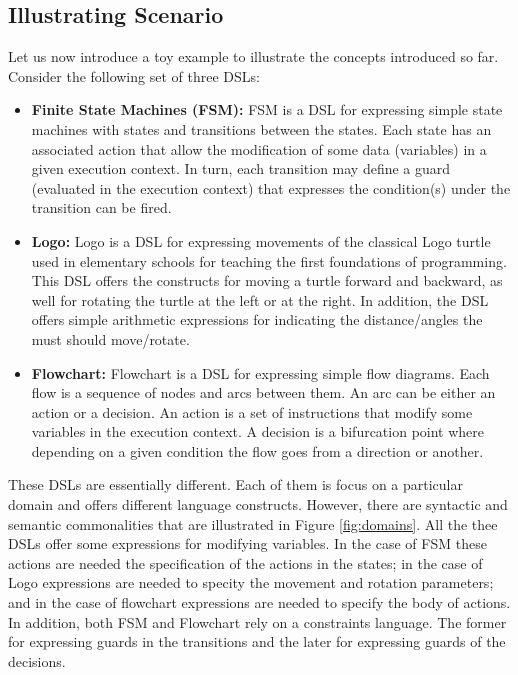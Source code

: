 \subsection{Illustrating Scenario}

Let us now introduce a toy example to illustrate the concepts introduced so far. Consider the following set of three DSLs:

\begin{itemize}
\item \textbf{Finite State Machines (FSM):} FSM is a DSL for expressing simple state machines with states and transitions between the states. Each state has an associated action that allow the modification of some data (variables) in a given execution context. In turn, each transition may define a guard (evaluated in the execution context) that expresses the condition(s) under the transition can be fired.

\vspace{2mm}
\item \textbf{Logo:} Logo is a DSL for expressing movements of the classical Logo turtle used in elementary schools for teaching the first foundations of programming. This DSL offers the constructs for moving a turtle forward and backward, as well for rotating the turtle at the left or at the right. In addition, the DSL offers simple arithmetic expressions for indicating the distance/angles the must should move/rotate. 

\vspace{2mm}
\item \textbf{Flowchart:} Flowchart is a DSL for expressing simple flow diagrams. Each flow is a sequence of nodes and arcs between them. An arc can be either an action or a decision. An action is a set of instructions that modify some variables in the execution context. A decision is a bifurcation point where depending on a given condition the flow goes from a direction or another. 
\end{itemize}

These DSLs are essentially different. Each of them is focus on a particular domain and offers different language constructs. However, there are syntactic and semantic commonalities that are illustrated in Figure \ref{fig:domains}. All the thee DSLs offer some expressions for modifying variables. In the case of FSM these actions are needed the specification of the actions in the states; in the case of Logo expressions are needed to specity the movement and rotation parameters; and in the case of flowchart expressions are needed to specify the body of actions. In addition, both FSM and Flowchart rely on a constraints language. The former for expressing guards in the transitions and the later for expressing guards of the decisions.

